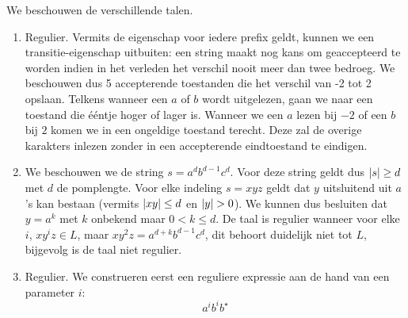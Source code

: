 \documentclass{article}
\begin{document}
\begin{answer}
We beschouwen de verschillende talen.
\begin{enumerate}
 \item Regulier. Vermits de eigenschap voor iedere prefix geldt, kunnen we een transitie-eigenschap uitbuiten: een string maakt nog kans om geaccepteerd te worden indien in het verleden het verschil nooit meer dan twee bedroeg. We beschouwen dus 5 accepterende toestanden die het verschil van -2 tot 2 opslaan. Telkens wanneer een $a$ of $b$ wordt uitgelezen, gaan we naar een toestand die \'e\'entje hoger of lager is. Wanneer we een $a$ lezen bij $-2$ of een $b$ bij $2$ komen we in een ongeldige toestand terecht. Deze zal de overige karakters inlezen zonder in een accepterende eindtoestand te eindigen.\\
 \begin{center}
 \end{center}
 \item We beschouwen we de string $s=a^db^{d-1}c^d$. Voor deze string geldt dus $\left|s\right|\geq d$ met $d$ de pomplengte. Voor elke indeling $s=xyz$ geldt dat $y$ uitsluitend uit $a$'s kan bestaan (vermits $\left|xy\right|\leq d$ en $\abs{y}>0$). We kunnen dus besluiten dat $y=a^k$ met $k$ onbekend maar $0<k\leq d$. De taal is regulier wanneer voor elke $i$, $xy^iz\in L$, maar $xy^2z=a^{d+k}b^{d-1}c^d$, dit behoort duidelijk niet tot $L$, bijgevolg is de taal niet regulier.
 \item Regulier. We construeren eerst een reguliere expressie aan de hand van een parameter $i$:
 \begin{equation}
  a^ib^ib^\star

\end{equation}
\end{enumerate}
\end{answer}
\end{document}
